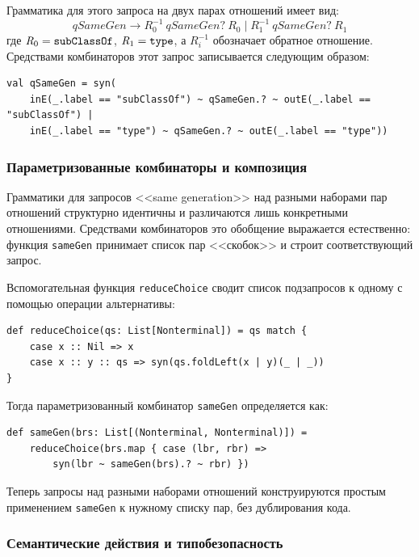 Грамматика для этого запроса на двух парах отношений имеет вид:
\[
    \mathit{qSameGen} \to \mathit{R}_0^{-1}\ \mathit{qSameGen?}\ \mathit{R}_0 \mid \mathit{R}_1^{-1}\ \mathit{qSameGen?}\ \mathit{R}_1
\]
где $\mathit{R}_0 = \text{\texttt{subClassOf}}$, $\mathit{R}_1 = \text{\texttt{type}}$, а $\mathit{R}_i^{-1}$ обозначает обратное отношение.
Средствами комбинаторов этот запрос записывается следующим образом:

\begin{verbatim}
val qSameGen = syn(
    inE(_.label == "subClassOf") ~ qSameGen.? ~ outE(_.label == "subClassOf") |
    inE(_.label == "type") ~ qSameGen.? ~ outE(_.label == "type"))
\end{verbatim}


\subsubsection{Параметризованные комбинаторы и композиция}

Грамматики для запросов <<same generation>> над разными наборами пар отношений структурно идентичны и различаются лишь конкретными отношениями.
Средствами комбинаторов это обобщение выражается естественно: функция \texttt{sameGen} принимает список пар <<скобок>> и строит соответствующий запрос.

Вспомогательная функция \texttt{reduceChoice} сводит список подзапросов к одному с помощью операции альтернативы:

\begin{verbatim}
def reduceChoice(qs: List[Nonterminal]) = qs match {
    case x :: Nil => x
    case x :: y :: qs => syn(qs.foldLeft(x | y)(_ | _))
}
\end{verbatim}

Тогда параметризованный комбинатор \texttt{sameGen} определяется как:

\begin{verbatim}
def sameGen(brs: List[(Nonterminal, Nonterminal)]) =
    reduceChoice(brs.map { case (lbr, rbr) =>
        syn(lbr ~ sameGen(brs).? ~ rbr) })
\end{verbatim}

Теперь запросы над разными наборами отношений конструируются простым применением \texttt{sameGen} к нужному списку пар, без дублирования кода.

\subsubsection{Семантические действия и типобезопасность}


